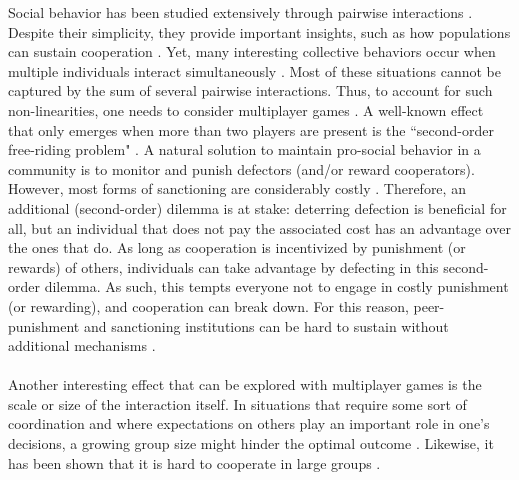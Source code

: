 \documentclass[11pt]{article}
\theoremstyle{plainCl1}
\theoremstyle{plainCl2}
\begin{document}
Social behavior has been studied extensively through pairwise interactions \cite{Hofbauer:book:1998}. Despite their simplicity, they provide important insights, such as how populations can sustain cooperation \cite{Axelrod:book:1984, Nowak:Science:2006,  Nowak:book:2011}. 
Yet, many interesting collective behaviors occur when multiple individuals interact simultaneously \cite{Palm:JMB:1984, Skyrms:book:2003, Pacheco:PRSB:2009, Archetti:EL:2011, Archetti:JTB:2012, Gokhale:DGAA:2014, Hilbe:JTB:2015, Venkateswaran:PRSB:2019}.
Most of these situations cannot be captured by the sum of several pairwise interactions. Thus, to account for such non-linearities, one needs to consider multiplayer games \cite{Gokhale:DGAA:2014}. A well-known effect that only emerges when more than two players are present is the ``second-order free-riding problem" \cite{Fowler:PNAS:2005}. A natural solution to maintain pro-social behavior in a community is to monitor and punish defectors (and/or reward cooperators). However, most forms of sanctioning are considerably costly \cite{Henrich:Science:2006}. Therefore, an additional (second-order) dilemma is at stake: deterring defection is beneficial for all, but an individual that does not pay the associated cost has an advantage over the ones that do. As long as cooperation is incentivized by punishment (or rewards) of others, individuals can take advantage by defecting in this second-order dilemma. As such, this tempts everyone not to engage in costly punishment (or rewarding), and cooperation can break down. For this reason, peer-punishment and sanctioning institutions can be hard to sustain without additional mechanisms \cite{Panchanathan:Nature:2004, Perc:SciRep:2012, Hilbe:SciRep:2012, Couto:JTB:2020, Pal:NatCom:2022}.
\\ \\
\noindent 
Another interesting effect that can be explored with multiplayer games is the scale or size of the interaction itself. In situations that require some sort of coordination and where expectations on others play an important role in one's decisions, a growing group size might hinder the optimal outcome \cite{Skyrms:book:2003}. Likewise, it has been shown that it is hard to cooperate in large groups \cite{Santos:PNAS:2011, Hilbe:JTB:2015}.
\end{document}
